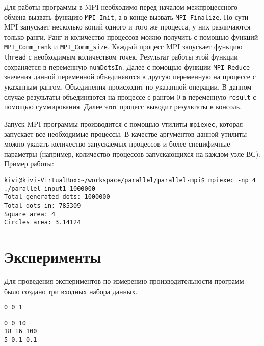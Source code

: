 Для работы программы в MPI необходимо перед началом межпроцессного обмена вызвать функцию \texttt{MPI\_Init}, а в конце вызвать \texttt{MPI\_Finalize}. По-сути MPI запускает несколько копий одного и того же процесса, у них различаются только ранги. Ранг и количество процессов можно получить с помощью функций \texttt{MPI\_Comm\_rank} и \texttt{MPI\_Comm\_size}. Каждый процесс MPI запускает функцию \texttt{thread} с необходимым количеством точек. Результат работы этой функции сохраняется в переменную \texttt{numDotsIn}. Далее с помощью функции \texttt{MPI\_Reduce} значения данной переменной объединяются в другую переменную на процессе с указанным рангом. Объединения происходит по указанной операции. В данном случае результаты объединяются на процессе с рангом 0 в переменную \texttt{result} с помощью суммирования. Далее этот процесс выводит результаты в консоль.

Запуск MPI-программы производится с помощью утилиты \texttt{mpiexec}, которая запускает все необходимые процессы. В качестве аргументов данной утилиты можно указать количество запускаемых процессов и более специфичные параметры (например, количество процессов запускающихся на каждом узле ВС). Пример работы:
\begin{lstlisting}[style=crs_bash]
kivi@kivi-VirtualBox:~/workspace/parallel/parallel-mpi$ mpiexec -np 4 ./parallel input1 1000000
Total generated dots: 1000000
Total dots in: 785309
Square area: 4
Circles area: 3.14124
\end{lstlisting}


\section{Эксперименты}

Для проведения экспериментов по измерению производительности программ было создано три входных набора данных.
\begin{lstlisting}[caption={Набор данных 1}, label={lst:input1}, style=crs_cpp]
0 0 1
\end{lstlisting}

\begin{lstlisting}[caption={Набор данных 2}, label={lst:input1}, style=crs_cpp]
0 0 10
18 16 100
5 0.1 0.1
\end{lstlisting}

